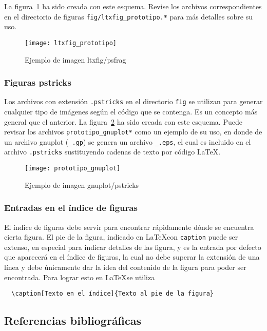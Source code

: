 La figura~\ref{fig:ltxfig} ha sido creada con este esquema.  Revise los
archivos correspondientes en el directorio de figuras
\texttt{fig/ltxfig\_prototipo.*} para más detalles sobre su uso.

\begin{figure}[htb]
  \centering
  \texttt{[image: ltxfig\_prototipo]}
  \caption{Ejemplo de imagen ltxfig/psfrag}
  \label{fig:ltxfig}
\end{figure}

\subsubsection{Figuras pstricks}  

Los archivos con extensión \texttt{.pstricks} en el directorio \texttt{fig} se
utilizan para generar cualquier tipo de imágenes según el código que se
contenga.  Es un concepto más general que el anterior.  La
figura~\ref{fig:pstricks} ha sido creada con este esquema.  Puede revisar los
archivos \texttt{prototipo\_gnuplot*} como un ejemplo de su uso, en donde de un
archivo gnuplot (\texttt{\_.gp}) se genera un archivo \texttt{\_.eps}, el cual
es incluido en el archivo \texttt{.pstricks} sustituyendo cadenas de texto por
código LaTeX.

\begin{figure}[htb]
  \centering
  \texttt{[image: prototipo\_gnuplot]}
  \caption{Ejemplo de imagen gnuplot/pstricks}
  \label{fig:pstricks}
\end{figure}

\subsubsection{Entradas en el índice de figuras}

El índice de figuras debe servir para encontrar rápidamente dónde se encuentra
cierta figura.  El pie de la figura, indicado en \LaTeX con \texttt{caption}
puede ser extenso, en especial para indicar detalles de las figura, y es la
entrada por defecto que aparecerá en el índice de figuras, la cual no debe
superar la extensión de una línea y debe únicamente dar la idea del contenido
de la figura para poder ser encontrada.  Para lograr esto en \LaTeX se utiliza
\begin{verbatim}
  \caption[Texto en el índice]{Texto al pie de la figura}
\end{verbatim}

\subsection{Referencias bibliográficas}


